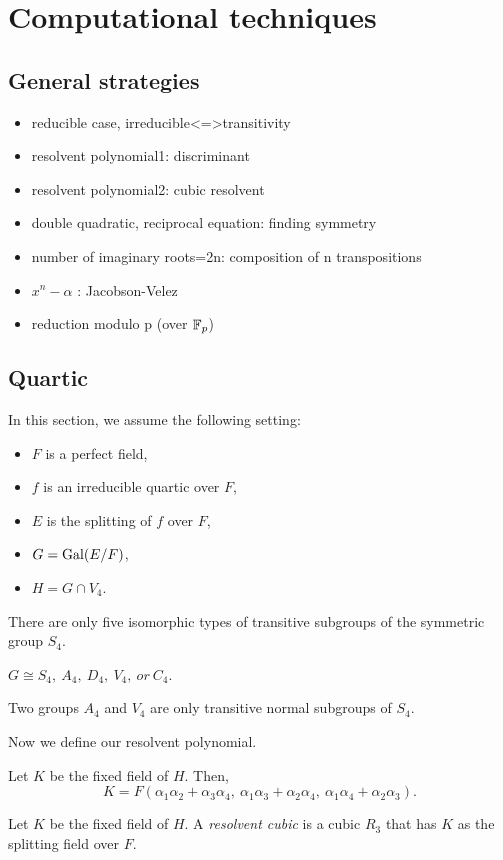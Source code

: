 \documentclass{../exp}
\begin{document}
\section{Computational techniques}

\subsection{General strategies}
\begin{itemize}
\item reducible case, irreducible<=>transitivity
\item resolvent polynomial1: discriminant
\item resolvent polynomial2: cubic resolvent
\item double quadratic, reciprocal equation: finding symmetry
\item number of imaginary roots=2n: composition of n transpositions
\item $x^n-\alpha$ :  Jacobson-Velez
\item reduction modulo p (over $\mathbb{F}_p$)
\end{itemize}

\subsection{Quartic}
In this section, we assume the following setting:
\begin{itemize}
\item $F$ is a perfect field, %
\item $f$ is an irreducible quartic over $F$,
\item $E$ is the splitting of $f$ over $F$,
\item $G=\operatorname{Gal}(E/F)$,
\item $H=G\cap V_4$. 
\end{itemize}
\begin{thm}
There are only five isomorphic types of transitive subgroups of the symmetric group $S_4$.
\end{thm}
\begin{cor}
$G\cong S_4,\ A_4,\ D_4,\ V_4,\ or\ C_4$.
\end{cor}
\begin{prop}
Two groups $A_4$ and $V_4$ are only transitive normal subgroups of $S_4$.
\end{prop}

Now we define our resolvent polynomial.
\begin{prop}
Let $K$ be the fixed field of $H$.
Then,
\[K=F(\alpha_1\alpha_2+\alpha_3\alpha_4,\ \alpha_1\alpha_3+\alpha_2\alpha_4,\ \alpha_1\alpha_4+\alpha_2\alpha_3).\]
\end{prop}
\begin{defn}
Let $K$ be the fixed field of $H$.
A \emph{resolvent cubic} is a cubic $R_3$ that has $K$ as the splitting field over $F$.
\end{defn}
\end{document}
